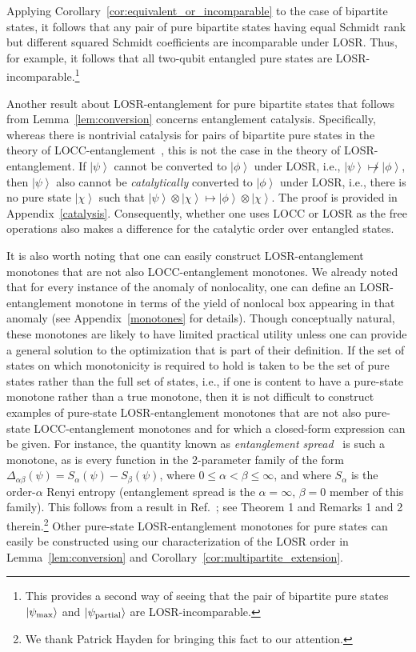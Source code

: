 \documentclass[12pt]{article}
\newcommand{\ket}[1]{\left| #1 \right>}
\theoremstyle{plain}
\theoremstyle{definition}
\begin{document}
Applying Corollary~\ref{cor:equivalent_or_incomparable} to the case of bipartite states, it follows that any pair of pure bipartite states having equal Schmidt rank but different squared Schmidt coefficients are incomparable under LOSR.  Thus, for example, it follows that all two-qubit entangled pure states are LOSR-incomparable.\footnote{This provides a second way of seeing that the pair of bipartite pure states $|\psi_{\rm max}\rangle$ and $|\psi_{\rm partial}\rangle$ are LOSR-incomparable.}

Another result about LOSR-entanglement for pure bipartite states that follows from Lemma~\ref{lem:conversion}
concerns entanglement catalysis.  Specifically, whereas there is nontrivial catalysis for pairs of bipartite pure states in the theory of LOCC-entanglement~\cite{JonathanPlenio}, this is not the case in the theory of LOSR-entanglement. If $\ket \psi$ cannot be converted to $\ket \phi$ under LOSR, i.e., $\ket{\psi} \not\mapsto \ket{\phi}$, then $\ket \psi$ also cannot be {\em catalytically} converted to $\ket \phi$ under LOSR, i.e., there is no pure state $\ket \chi$ such that $\ket{\psi} \otimes \ket{\chi} \mapsto \ket{\phi} \otimes \ket{\chi}$.  The proof is provided in Appendix~\ref{catalysis}. Consequently, whether one uses LOCC or LOSR as the free operations also makes a difference for the catalytic order over entangled states. 


It is also worth noting that one can easily construct LOSR-entanglement monotones that are not also LOCC-entanglement monotones.  We already noted that for every instance of the anomaly of nonlocality, one can define an LOSR-entanglement monotone in terms of the yield of nonlocal box appearing in that anomaly (see Appendix~\ref{monotones} for details). Though conceptually natural, these monotones are likely to have limited practical utility unless one can provide a general solution to the optimization that is part of their definition.  If the set of states on which monotonicity is required to hold is taken to be the set of pure states rather than the full set of states,  i.e., if one is content to have a pure-state monotone rather than a true monotone, then it is not difficult to construct examples of pure-state LOSR-entanglement monotones that are not also pure-state LOCC-entanglement monotones and for which a closed-form expression can be given. For instance, the quantity known as {\em entanglement spread}~\cite{Harrow2010} is such a monotone, as is every function in the 2-parameter family of the form $\Delta_{\alpha \beta}(\psi) = S_{\alpha}(\psi) - S_{\beta}(\psi)$, where $0\le \alpha < \beta\le \infty$,
 and where $S_{\alpha}$ is the order-$\alpha$ Renyi entropy (entanglement spread is the $\alpha=\infty$, $\beta=0$ member of this family). This follows from a result in Ref.~\cite{Hayden2003}; see Theorem 1 and Remarks 1 and 2 therein.\footnote{We thank Patrick Hayden for bringing this fact to our attention.}  Other pure-state LOSR-entanglement monotones for pure states can easily be constructed using our characterization of the LOSR order in Lemma~\ref{lem:conversion} and Corollary~\ref{cor:multipartite_extension}. 
\end{document}
